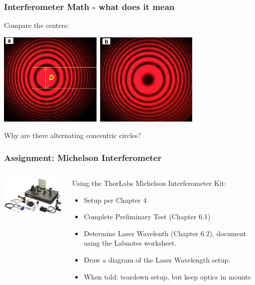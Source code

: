 \documentclass{beamer}
\begin{document}
\begin{frame}\frametitle{Interferometer Math - what does it mean}
Compare the centers:

\begin{center}
\includegraphics[width=10cm]{fig/fringe2.jpeg}
\end{center}

Why are there alternating concentric circles?
\end{frame}


\begin{frame}\frametitle{Assignment: Michelson Interferometer}
\begin{columns}
\begin{column}{5cm}
\begin{center}
\includegraphics[width=4.5cm]{fig/mint2.jpg}
\end{center}
\end{column}
\begin{column}{6cm}
Using the ThorLabs Michelson Interferometer Kit:
\begin{itemize}
\item Setup per Chapter 4
\item Complete Preliminary Test (Chapter 6.1)
\item Determine Laser Wavelenth (Chapter 6.2), document using the Labnotes worksheet.
\item Draw a diagram of the Laser Wavelength setup.
\item When told: teardown setup, but keep optics in mounts
\end{itemize}
\end{column}
\end{columns}
\end{frame}
\end{document}
